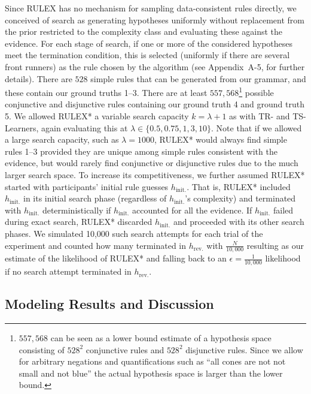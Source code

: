 \documentclass[doc,natbib,floatsintext]{apa7}
\newcommand{\hr}{h_{\mathrm{rev.}}}
\newcommand{\hi}{h_{\mathrm{init.}}}
\begin{document}
Since RULEX has no mechanism for sampling data-consistent rules directly, we conceived of search as generating hypotheses uniformly without replacement from the prior restricted to the complexity class and evaluating these against the evidence. For each stage of search, if one or more of the considered hypotheses meet the termination condition, this is selected (uniformly if there are several front runners) as the rule chosen by the algorithm (see Appendix~A-5, for further details). There are $528$ simple rules that can be generated from our grammar, and these contain our ground truths 1--3. There are at least $557,568$\footnote{$557,568$ can be seen as a lower bound estimate of a hypothesis space consisting of $528^2$ conjunctive rules and $528^2$ disjunctive rules. Since we allow for arbitrary negations and quantifications such as ``all cones are not not small and not blue'' the actual hypothesis space is larger than the lower bound.} possible conjunctive and disjunctive rules containing our ground truth 4 and ground truth 5. We allowed RULEX* a variable search capacity $k = \lambda +1 $ as with TR- and TS-Learners, again evaluating this at $\lambda \in \{0.5, 0.75, 1, 3, 10\}$. Note that if we allowed a large search capacity, such as $\lambda = 1000$, RULEX* would always find simple rules 1--3 provided they are unique among simple rules consistent with the evidence, but would rarely find conjunctive or disjunctive rules due to the much larger search space. To increase its competitiveness, we further assumed RULEX* started with participants' initial rule guesses $\hi$. That is, RULEX* included $\hi$ in its initial search phase (regardless of $\hi$'s complexity) and terminated with $\hi$ deterministically if $\hi$ accounted for all the evidence. If $\hi$ failed during exact search, RULEX* discarded $\hi$ and proceeded with its other search phases. We simulated 10,000 such search attempts for each trial of the experiment and counted how many terminated in $\hr$ with $\frac{N}{10,000}$ resulting as our estimate of the likelihood of RULEX* and falling back to an $\epsilon=\frac{1}{10,000}$ likelihood if no search attempt terminated in $\hr$.



\subsection{Modeling Results and Discussion}
\end{document}
